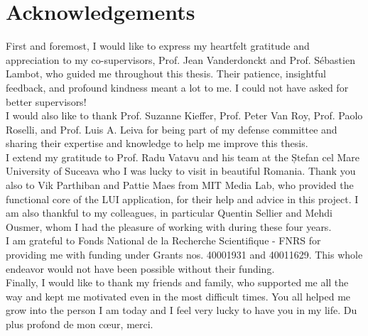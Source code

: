 \chapter*{Acknowledgements}

First and foremost, I would like to express my heartfelt gratitude and appreciation to my co-supervisors, Prof. Jean Vanderdonckt and Prof. S\'ebastien Lambot, who guided me throughout this thesis. Their patience, insightful feedback, and profound kindness meant a lot to me. I could not have asked for better supervisors!
\\

I would also like to thank Prof. Suzanne Kieffer, Prof. Peter Van Roy, Prof. Paolo Roselli, and Prof. Luis A. Leiva for being part of my defense committee and sharing their expertise and knowledge to help me improve this thesis.
\\

I extend my gratitude to Prof. Radu Vatavu and his team at the Ștefan cel Mare University of Suceava who I was lucky to visit in beautiful Romania. Thank you also to Vik Parthiban and Pattie Maes from MIT Media Lab, who provided the
functional core of the LUI application, for their help and advice in this project.
I am also thankful to my colleagues, in particular Quentin Sellier and Mehdi Ousmer, whom I had the pleasure of working with during these four years.
\\

I am grateful to Fonds National de la Recherche Scientifique - FNRS for providing me with funding under Grants nos. 40001931 and 40011629. This whole endeavor would not have been possible without their funding.
\\

Finally, I would like to thank my friends and family, who supported me all the way and kept me motivated even in the most difficult times. You all helped me grow into the person I am today and I feel very lucky to have you in my life. Du plus profond de mon c\oe{}ur, merci.